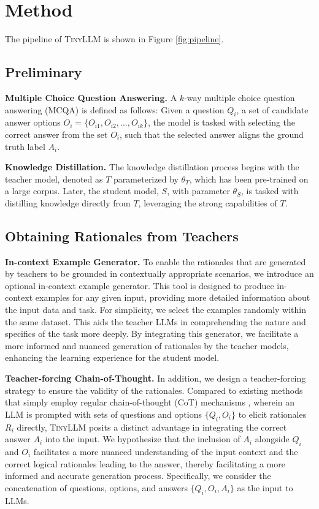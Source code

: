 \documentclass[sigconf,nonacm]{acmart}
\newcommand{\ours}{\textsc{TinyLLM}\xspace}
\begin{document}
\section{Method}
The pipeline of \ours is shown in Figure \ref{fig:pipeline}.


\vspace{-0.05in}
\subsection{Preliminary}
\textbf{Multiple Choice Question Answering.} A $k$-way multiple choice question answering (MCQA) is defined as follows: Given a question $Q_i$, a set of candidate answer options $O_i=\{O_{i1},O_{i2},...,O_{ik}\}$, the model is tasked with selecting the correct answer from the set $O_i$, such that the selected answer aligns the ground truth label $A_i$.


\noindent \textbf{Knowledge Distillation.} 
The knowledge distillation process begins with the teacher model, denoted as $T$ parameterized by $\theta_T$, which has been pre-trained on a large corpus. Later, the student model, $S$, with parameter $\theta_S$, is tasked with distilling knowledge directly from $T$, leveraging the strong capabilities of $T$.


\subsection{Obtaining Rationales from Teachers}


\noindent
\textbf{In-context Example Generator.}
To enable the rationales that are generated by teachers to be grounded in contextually appropriate scenarios, we introduce an optional in-context example generator. This tool is designed to produce in-context examples for any given input, providing more detailed information about the input data and task. For simplicity, we select the examples randomly within the same dataset. This aids the teacher LLMs in comprehending the nature and specifics of the task more deeply. By integrating this generator, we facilitate a more informed and nuanced generation of rationales by the teacher models, enhancing the learning experience for the student model. 

\noindent
\textbf{Teacher-forcing Chain-of-Thought.}
In addition, we design a teacher-forcing strategy to ensure the validity of the rationales. Compared to existing methods that simply employ regular chain-of-thought (CoT) mechanisms \cite{wei2022chainofthought,kojima2022zero}, wherein an LLM is prompted with sets of questions and options \(\{Q_i, O_i\}\) to elicit rationales \(R_i\) directly, \ours posits a distinct advantage in integrating the correct answer \(A_i\) into the input. We hypothesize that the inclusion of \(A_i\) alongside \(Q_i\) and \(O_i\) facilitates a more nuanced understanding of the input context and the correct logical rationales leading to the answer, thereby facilitating a more informed and accurate generation process. Specifically, we consider the concatenation of questions, options, and answers \(\{Q_i, O_i, A_i\}\) as the input to LLMs.
\end{document}

